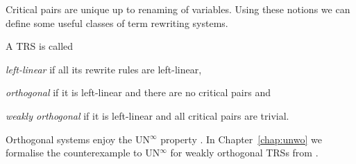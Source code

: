 Critical pairs are unique up to renaming of variables. Using these
notions we can define some useful classes of term rewriting systems.



\begin{definition}%
A TRS is called
\begin{compactenum}
  \item \emph{left-linear} if all its rewrite rules are left-linear,
  \item \emph{orthogonal} if it is left-linear and there are no critical pairs and
  \item \emph{weakly orthogonal} if it is left-linear and all critical pairs
    are trivial.
\end{compactenum}
\end{definition}

Orthogonal systems enjoy the UN$^\infty$ property
\citep{kennaway-95,klop-de-vrijer-05}. In Chapter~\ref{chap:unwo} we
formalise the counterexample to UN$^\infty$ for weakly orthogonal TRSs
from \citet{endrullis-10}.
